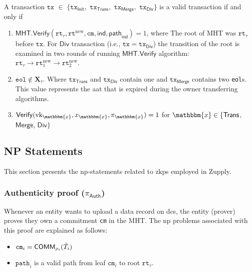 \begin{definition}
	\label{def:Valid Transaction}
	A transaction $\texttt{tx} $ $ \in $ $ \{ \texttt{tx}_\textsf{Init}, $ $ \texttt{tx}_\textsf{Trans}, $ $ \texttt{tx}_\textsf{Merge}, $ $ \texttt{tx}_\textsf{Div} \}$ is a valid transaction if and only if
	\begin{enumerate}
		\item $\mathsf{MHT}.\mathsf{Verify}(\texttt{rt}_{\tau}, \texttt{rt}^\text{new}, \texttt{cm}, \mathsf{ind}, \mathsf{path}_\mathsf{ind}) = 1$, where The root of \textsf{MHT} was $\texttt{rt}_{\tau}$ before $\texttt{tx}$. For $\textsf{Div}$ transaction (i.e., $\texttt{tx}= \texttt{tx}_\textsf{Div}$) the transition of the root is examined in two rounds of running $\mathsf{MHT}.\mathsf{Verify}$ algorithm: $\texttt{rt}_\tau \rightarrow \texttt{rt}^\text{new}_1 \rightarrow \texttt{rt}^\text{new}_2$. 
		
		
		\item $\texttt{eol} \notin  \mathbf{X}_\tau$. Where $\texttt{tx}_\mathsf{Trans}$ and $\texttt{tx}_\mathsf{Div}$ contain one and $\texttt{tx}_\mathsf{Merge}$ contains two \texttt{eol}s. This value represents the \gls{aat} that is expired during the owner transferring algorithms.
		
		\item $\mathsf{Verify}(\text{vk}_\mathbbm{x}, x_\mathbbm{x}, \pi_\mathbbm{x}) = 1$ for $\mathbbm{x} \in \{\mathsf{Trans}$, $\mathsf{Merge}$, $\mathsf{Div} \}$
		
	\end{enumerate}
\end{definition}




\subsection{NP Statements}
\label{sec:Zero-knowledge Proofs}
This section presents the \gls{np}-statements related to \gls{zkp}s employed in Zupply. 


\subsubsection{Authenticity proof ($\pi_\textsf{Auth}$)}
Whenever an entity wants to upload a data record on \gls{dcs}, the entity (prover) proves they own a commitment \texttt{cm} in the \textsf{MHT}. The \gls{np} problems associated with this proof are explained as follows:

    
\begin{itemize}

    \item $\texttt{cm}_i =\mathsf{COMM}_{\rho_i}(\Tilde{T}_i)$
	\item $\texttt{path}_i$ is a valid path from leaf  $\texttt{cm}_i$ to root $\texttt{rt}_\tau$.
\end{itemize}

